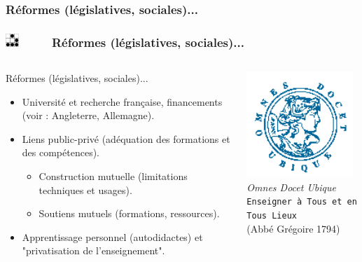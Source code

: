 \documentclass[slidetop,11pt]{beamer}
\def\sectionPartIIIcUN{R{\'e}formes (l{\'e}gislatives, sociales)...}
\def\moreInFrameTitle{\includegraphics[height=0.5cm]{img/logo_glider.png}~~~~~}
\begin{document}
\subsubsection{\sectionPartIIIcUN}
\begin{frame}
	\frametitle{\moreInFrameTitle \sectionPartIIIcUN}
	\begin{columns}[c]
	\begin{column}[c]{7cm}
		\begin{beamerboxesrounded}	[lower=substructureUN, %
		 				 upper=block title UN,%
						 shadow=true]%
			{\sectionPartIIIcUN}
			\begin{itemize}
				\item Universit{\'e} et recherche fran\c{c}aise, financements (voir : Angleterre, Allemagne). 
				\item Liens public-priv{\'e} (ad{\'e}quation des formations et des comp{\'e}tences). 
				\begin{itemize}
					\item Construction mutuelle (limitations techniques et usages). 
					\item Soutiens mutuels (formations, ressources). 
				\end{itemize}
				\item Apprentissage personnel (autodidactes) et "privatisation de l'enseignement". 
			\end{itemize}
		\end{beamerboxesrounded}
	\end{column}
	\begin{column}[c]{4cm}
		\includegraphics[width=4cm]{img/omnesDOCETubique.png}~\\
		\emph{Omnes Docet Ubique}~\\ \footnotesize{ \texttt{Enseigner {\`a} Tous et en Tous Lieux} ~\\ (Abb{\'e} Gr{\'e}goire 1794) }
	\end{column}
	\end{columns}
\end{frame} 
\end{document}
